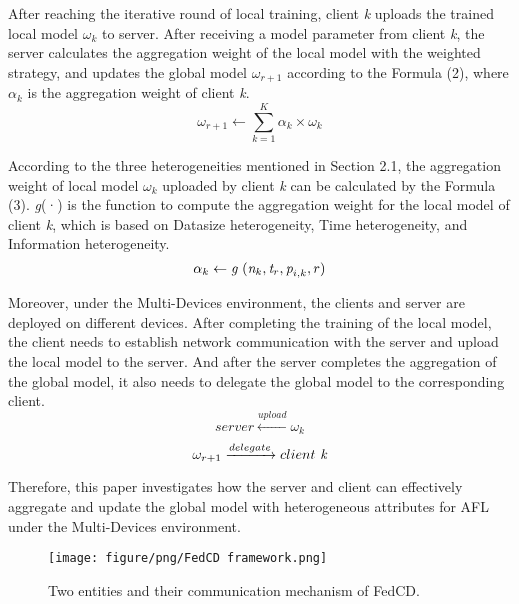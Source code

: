 \documentclass[twoside,twocolumn]{article}
\begin{document}
\begin{spacing}{1.0}
	After reaching the iterative round of local training, client \emph{k} uploads the trained local model $\omega_k$ to server. After receiving a model parameter from client \emph{k}, the server calculates the aggregation weight of the local model with the weighted strategy, and updates the global model $\omega_{r+1}$ according to the Formula (2), where $\alpha_k$ is the aggregation weight of client \emph{k}. 
\begin{equation}
\omega_{r+1} \leftarrow \sum_{k=1}^{K} \alpha_k \times \omega_k
\end{equation}

	According to the three heterogeneities mentioned in Section 2.1, the aggregation weight of local model $\omega_k$ uploaded by client \emph{k} can be calculated by the Formula (3). \emph{g}(·) is the function to compute the aggregation weight for the local model of client \emph{k}, which is based on Datasize heterogeneity, Time heterogeneity, and Information heterogeneity.\\
\begin{equation}
\alpha_{k} \leftarrow \emph{g}\ ( \emph{n}_k,\emph{t}_r,\emph{p}_{i,k},r )
\end{equation}

	Moreover, under the Multi-Devices environment, the clients and server are deployed on different devices. After completing the training of the local model, the client needs to establish network communication with the server and upload the local model to the server. And after the server completes the aggregation of the global model, it also needs to delegate the global model to the corresponding client.
%
\begin{equation}
server\xleftarrow{upload}\omega_k
\end{equation}
\begin{equation}
\omega_{r+1}\xrightarrow{delegate} client\ \emph{k}
\end{equation}

	Therefore, this paper investigates how the server and client can effectively aggregate and update the global model with heterogeneous attributes for AFL under the Multi-Devices environment.

\begin{figure*}
\centerline{\texttt{[image: figure/png/FedCD framework.png]}}
\caption{Two entities and their communication mechanism of FedCD.} \label{fig1}
\end{figure*}
	

\end{spacing}
\end{document}
